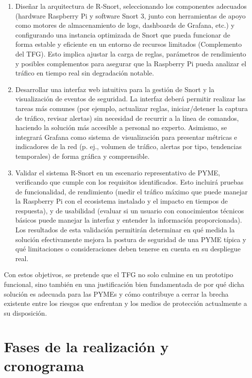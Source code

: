 \documentclass[11pt,a4paper,twoside]{report}
\begin{document}
\begin{enumerate}	
	\item Diseñar la arquitectura de R-Snort, seleccionando los componentes adecuados (hardware Raspberry Pi y software Snort 3, junto con herramientas de apoyo como motores de almacenamiento de logs, dashboards de Grafana, etc.) y configurando una instancia optimizada de Snort que pueda funcionar de forma estable y eficiente en un entorno de recursos limitados (Complemento del TFG). Esto implica ajustar la carga de reglas, parámetros de rendimiento y posibles complementos para asegurar que la Raspberry Pi pueda analizar el tráfico en tiempo real sin degradación notable.
	
	\item Desarrollar una interfaz web intuitiva para la gestión de Snort y la visualización de eventos de seguridad. La interfaz deberá permitir realizar las tareas más comunes (por ejemplo, actualizar reglas, iniciar/detener la captura de tráfico, revisar alertas) sin necesidad de recurrir a la línea de comandos, haciendo la solución más accesible a personal no experto. Asimismo, se integrará Grafana como sistema de visualización para presentar métricas e indicadores de la red (p. ej., volumen de tráfico, alertas por tipo, tendencias temporales) de forma gráfica y comprensible.
	
	\item Validar el sistema R-Snort en un escenario representativo de PYME, verificando que cumple con los requisitos identificados. Esto incluirá pruebas de funcionalidad, de rendimiento (medir el tráfico máximo que puede manejar la Raspberry Pi con el ecosistema instalado y el impacto en tiempos de respuesta), y de usabilidad (evaluar si un usuario con conocimientos técnicos básicos puede manejar la interfaz y entender la información proporcionada). Los resultados de esta validación permitirán determinar en qué medida la solución efectivamente mejora la postura de seguridad de una PYME típica y qué limitaciones o consideraciones deben tenerse en cuenta en su despliegue real.
\end{enumerate}

Con estos objetivos, se pretende que el TFG no solo culmine en un prototipo funcional, sino también en una justificación bien fundamentada de por qué dicha solución es adecuada para las PYMEs y cómo contribuye a cerrar la brecha existente entre los riesgos que enfrentan y los medios de protección actualmente a su disposición.

\section{Fases de la realización y cronograma}
\end{document}
